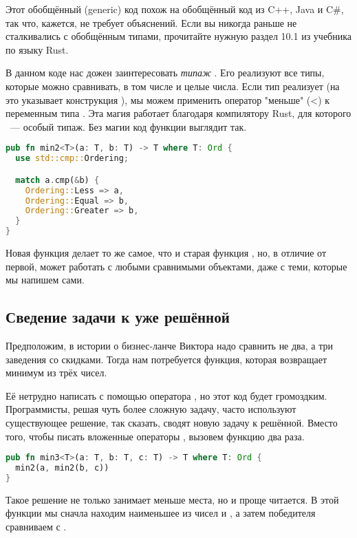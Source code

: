 Этот обобщённый (generic) код похож на обобщённый код из C++, Java и C\#, так что, кажется, не требует объяснений.
Если вы никогда раньше не сталкивались с обобщённым типами, прочитайте нужную раздел 10.1 \cite{rustlang} из учебника по языку Rust.

В данном коде нас дожен заинтересовать {\em типаж} .
Его реализуют все типы, которые можно сравнивать, в том числе и целые числа.
Если тип  реализует  (на это указывает конструкция ), мы можем применить оператор "меньше" (<) к переменным типа .
Эта магия работает благодаря компилятору Rust, для которого ~--- особый типаж.
Без магии код функции  выглядит так.

\begin{lstlisting}[language=Rust]
pub fn min2<T>(a: T, b: T) -> T where T: Ord {
  use std::cmp::Ordering;

  match a.cmp(&b) {
    Ordering::Less => a,
    Ordering::Equal => b,
    Ordering::Greater => b,
  }
}
\end{lstlisting}

Новая функция  делает то же самое, что и старая функция , но, в отличие от первой, может работать с любыми сравнимыми объектами, даже с теми, которые мы напишем сами.

\subsection{Сведение задачи к уже решённой}

Предположим, в истории о бизнес-ланче Виктора надо сравнить не два, а три заведения со скидками.
Тогда нам потребуется функция, которая возвращает минимум из трёх чисел.

Её нетрудно написать с помощью оператора , но этот код будет громоздким.
Программисты, решая чуть более сложную задачу, часто используют существующее решение, так сказать, сводят новую задачу к решённой.
Вместо того, чтобы писать вложенные операторы , вызовем функцию  два раза.

\begin{lstlisting}[language=Rust]
pub fn min3<T>(a: T, b: T, c: T) -> T where T: Ord {
  min2(a, min2(b, c))
}
\end{lstlisting}

Такое решение не только занимает меньше места, но и проще читается.
В этой функции мы сначла находим наименьшее из чисел  и , а затем победителя сравниваем с .

